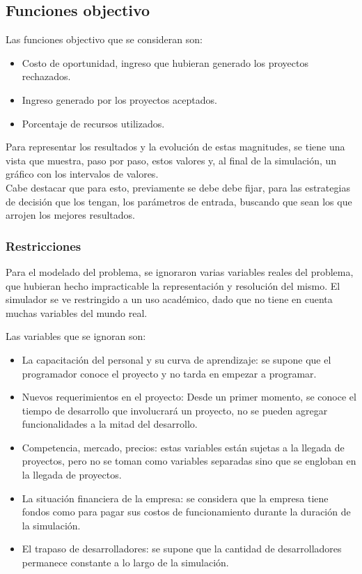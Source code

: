 \documentclass[a4paper,10pt]{article}
\begin{document}
\subsection{Funciones objectivo}
Las funciones objectivo que se consideran son:

\begin{itemize}
    \item Costo de oportunidad, ingreso que hubieran generado los proyectos rechazados.
    \item Ingreso generado por los proyectos aceptados.
    \item Porcentaje de recursos utilizados.
\end{itemize}

Para representar los resultados y la evolución de estas magnitudes, se tiene una vista que muestra, paso por paso, estos valores y, al final de la simulación, un
gráfico con los intervalos de valores. \\

Cabe destacar que para esto, previamente se debe debe fijar, para las estrategias de decisión que los tengan, los parámetros de entrada, buscando que sean los
que arrojen los mejores resultados.\\

\subsubsection{Restricciones}

Para el modelado del problema, se ignoraron varias variables reales del problema, que hubieran hecho impracticable la representación y resolución del mismo. El simulador se ve 
restringido a un uso académico, dado que no tiene en cuenta muchas variables del mundo real.

Las variables que se ignoran son: \\

\begin{itemize}
    \item La capacitación del personal y su curva de aprendizaje: se supone que el programador conoce el proyecto y no tarda en empezar a programar.
    \item Nuevos requerimientos en el proyecto: Desde un primer momento, se conoce el tiempo de desarrollo que involucrará un proyecto, no se pueden agregar 
            funcionalidades a la mitad del desarrollo.
    \item Competencia, mercado, precios: estas variables están sujetas a la llegada de proyectos, pero no se toman como variables separadas sino que se engloban en la 
        llegada de proyectos.
    \item La situación financiera de la empresa: se considera que la empresa tiene fondos como para pagar sus costos de funcionamiento durante la duración de la simulación.
    \item El trapaso de desarrolladores: se supone que la cantidad de desarrolladores permanece constante a lo largo de la simulación.
\end{itemize}
\end{document}
